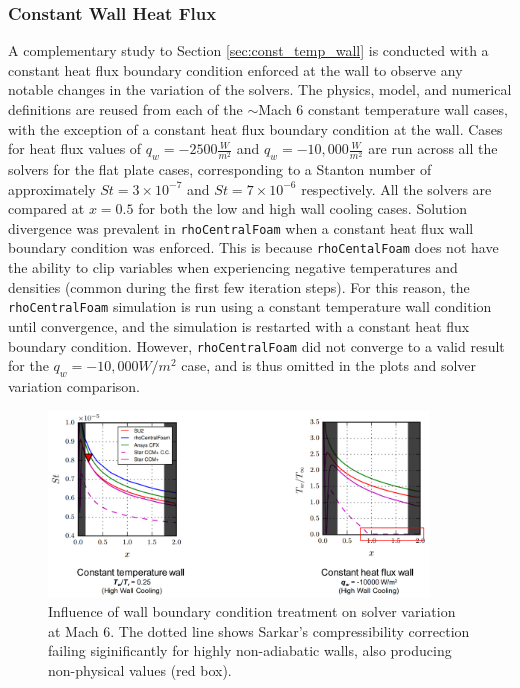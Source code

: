 \documentclass[journal ]{new-aiaa}
\begin{document}
\subsubsection{Constant Wall Heat Flux}
A complementary study to Section \ref{sec:const_temp_wall} is conducted with a constant heat flux boundary condition enforced at the wall to observe any notable changes in the variation of the solvers. The physics, model, and numerical definitions are reused from each of the $\sim$Mach 6 constant temperature wall cases, with the exception of a constant heat flux boundary condition at the wall. Cases for heat flux values of $q_w = -2500 \frac{W}{m^2}$ and $q_w = -10,000 \frac{W}{m^2}$ are run across all the solvers for the flat plate cases, corresponding to a Stanton number of approximately $St = 3 \times 10^{-7}$ and $St = 7 \times 10^{-6}$ respectively. All the solvers are compared at $x=0.5$ for both the low and high wall cooling cases. Solution divergence was prevalent in \texttt{rhoCentralFoam} when a constant heat flux wall boundary condition was enforced.
This is because \texttt{rhoCentalFoam} does not have the ability to clip variables when experiencing negative temperatures and densities (common during the first few iteration steps). For this reason, the \texttt{rhoCentralFoam} simulation is run using a constant temperature wall condition until convergence, and the simulation is restarted with a constant heat flux boundary condition. However, \texttt{rhoCentralFoam} did not converge to a valid result for the $q_w = -10,000 W/m^2$ case, and is thus omitted in the plots and solver variation comparison.

\begin{figure}[htb]
\centering
    \includegraphics[width=0.9\textwidth]{CHT/Wall_Heat_Flux_2.png}
  \caption{Influence of wall boundary condition treatment on solver variation at Mach 6. The dotted line shows Sarkar's compressibility correction failing siginificantly for highly non-adiabatic walls, also producing non-physical values (red box).}
  \label{fig:Sarkar}
\end{figure}
\end{document}
